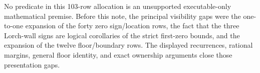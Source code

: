 \documentclass[11pt]{article}
\begin{document}
No predicate in this 103-row allocation is an unsupported executable-only
mathematical premise.  Before this note, the principal visibility gaps were
the one-to-one expansion of the forty zero sign/location rows, the fact that
the three Lorch-wall signs are logical corollaries of the strict first-zero
bounds, and the expansion of the twelve floor/boundary rows.  The displayed
recurrences, rational margins, general floor identity, and exact ownership
arguments close those presentation gaps.
\end{document}
